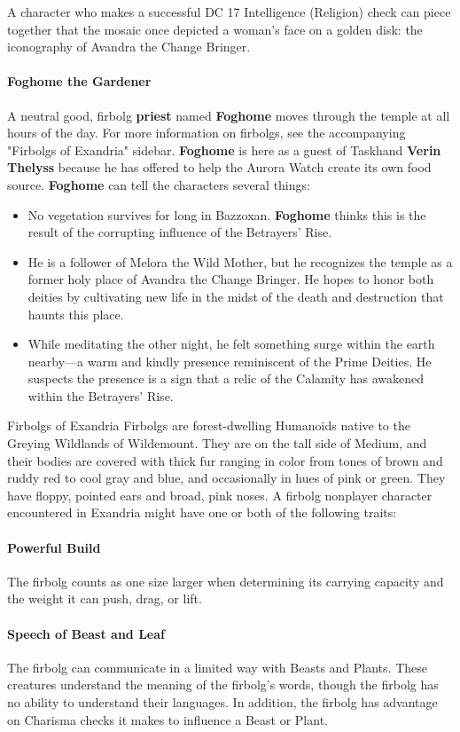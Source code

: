 \documentclass[10pt,a4,twoside,twocolumn,openany,nodeprecatedcode]{dndbook}
\begin{document}
A character who makes a successful DC 17 Intelligence (Religion) check can piece together that the mosaic once depicted a woman's face on a golden disk: the iconography of Avandra the Change Bringer.
\paragraph{Foghome the Gardener}
A neutral good, firbolg \textbf{priest} named \textbf{Foghome} moves through the temple at all hours of the day. For more information on firbolgs, see the accompanying "Firbolgs of Exandria" sidebar.
\textbf{Foghome} is here as a guest of Taskhand \textbf{Verin Thelyss} because he has offered to help the Aurora Watch create its own food source. \textbf{Foghome} can tell the characters several things:
\begin{itemize}

\item No vegetation survives for long in Bazzoxan. \textbf{Foghome} thinks this is the result of the corrupting influence of the Betrayers' Rise.
\item He is a follower of Melora the Wild Mother, but he recognizes the temple as a former holy place of Avandra the Change Bringer. He hopes to honor both deities by cultivating new life in the midst of the death and destruction that haunts this place.
\item While meditating the other night, he felt something surge within the earth nearby—a warm and kindly presence reminiscent of the Prime Deities. He suspects the presence is a sign that a relic of the Calamity has awakened within the Betrayers' Rise.
\end{itemize}


\begin{DndComment}{Firbolgs of Exandria}
Firbolgs are forest-dwelling Humanoids native to the Greying Wildlands of Wildemount. They are on the tall side of Medium, and their bodies are covered with thick fur ranging in color from tones of brown and ruddy red to cool gray and blue, and occasionally in hues of pink or green. They have floppy, pointed ears and broad, pink noses.
A firbolg nonplayer character encountered in Exandria might have one or both of the following traits:
\paragraph{Powerful Build}
The firbolg counts as one size larger when determining its carrying capacity and the weight it can push, drag, or lift.
\paragraph{Speech of Beast and Leaf}
The firbolg can communicate in a limited way with Beasts and Plants. These creatures understand the meaning of the firbolg's words, though the firbolg has no ability to understand their languages. In addition, the firbolg has advantage on Charisma checks it makes to influence a Beast or Plant.
\end{DndComment}
\end{document}
